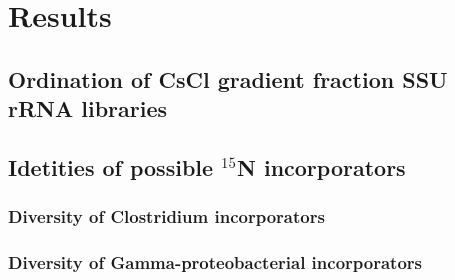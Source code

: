 \section{Results}
\subsection{Ordination of CsCl gradient fraction SSU rRNA libraries}
\subsection{Idetities of possible $^{15}$N incorporators}
\subsubsection{Diversity of Clostridium incorporators}
\subsubsection{Diversity of Gamma-proteobacterial incorporators}



